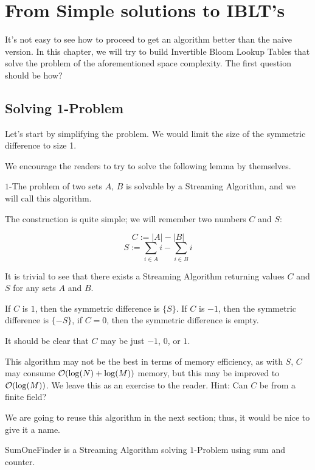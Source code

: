 \section{From Simple solutions to IBLT's}

It's not easy to see how to proceed to get an algorithm better than the naive version. In this chapter, we will try to build Invertible Bloom Lookup Tables that solve the problem of the aforementioned space complexity. The first question should be how?

\subsection{Solving 1-Problem}

Let's start by simplifying the problem. We would limit the size of the symmetric difference to size 1.

We encourage the readers to try to solve the following lemma by themselves.

\begin{lemma}
\(1\)-The problem of two sets \(A\), \(B\) is solvable by a Streaming Algorithm, and we will call this algorithm.
\end{lemma}

The construction is quite simple; we will remember two numbers \(C\) and \(S\):

\[ C := |A| - |B| \]
\[ S := \sum_{i\in A} i - \sum_{i\in B} i \]

It is trivial to see that there exists a Streaming Algorithm returning values \(C\) and \(S\) for any sets \(A\) and \(B\).

If \(C\) is \(1\), then the symmetric difference is \(\{S\}\). If \(C\) is \(-1\), then the symmetric difference is \(\{-S\}\), if \(C = 0\), then the symmetric difference is empty.

It should be clear that \(C\) may be just \(-1\), \(0\), or \(1\).

This algorithm may not be the best in terms of memory efficiency, as with \(S\), \(C\) may consume \(\mathcal{O}(\log(N) + \log(M))\) memory, but this may be improved to \(\mathcal{O}(\log(M))\). We leave this as an exercise to the reader. Hint: Can \(C\) be from a finite field?

We are going to reuse this algorithm in the next section; thus, it would be nice to give it a name.

\begin{defn}
    SumOneFinder is a Streaming Algorithm solving \(1\)-Problem using sum and counter. 
\end{defn}

